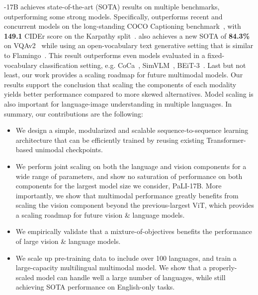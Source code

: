 \documentclass{article}
\begin{document}
\NAME-17B achieves state-of-the-art (SOTA) results on multiple benchmarks, outperforming some strong models. 
Specifically, \NAME outperforms recent and concurrent models on the long-standing COCO Captioning benchmark~\citep{coco}, with \textbf{149.1} CIDEr score on the Karpathy split~\citep{cocokarp}. 
\NAME also achieves a new SOTA of \textbf{84.3\%} on VQAv2~\citep{vqav2} while using an open-vocabulary text generative setting that is similar to Flamingo~\citep{flamingo}.
This result outperforms even models evaluated in a fixed-vocabulary classification setting, e.g. CoCa~\citep{coca}, SimVLM~\citep{simvlm}, BEiT-3~\citep{beit3}.
Last but not least, our work provides a scaling roadmap for future multimodal models.
Our results support the conclusion that scaling the components of each modality yields better performance compared to more skewed alternatives.
Model scaling is also important for language-image understanding in multiple languages.
%
In summary, our contributions are the following:
\begin{itemize}
    \item We design a simple, modularized and scalable sequence-to-sequence learning architecture that can be efficiently trained by reusing existing Transformer-based unimodal checkpoints.
    \item We perform joint scaling on both the language and vision components for a wide range of parameters, and show no saturation of performance on both components for the largest model size we consider, PaLI-17B.
    More importantly, we show that multimodal performance greatly benefits from scaling the vision component beyond the previous-largest ViT, which provides a scaling roadmap for future vision \& language models.
    \item We empirically validate that a mixture-of-objectives benefits the performance of large vision \& language models.
    \item We scale up pre-training data to include over 100 languages, and train a large-capacity multilingual multimodal model. We show that a properly-scaled model can handle well a large number of languages, while still achieving SOTA performance on English-only tasks.
\end{itemize}
\end{document}
